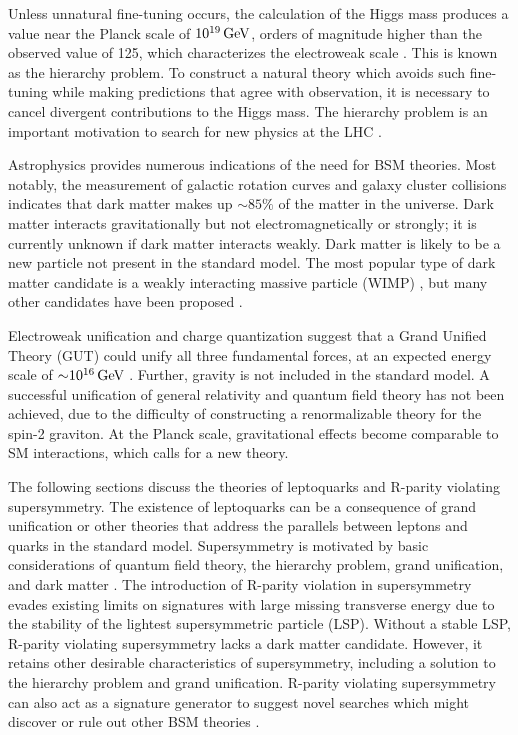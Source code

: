 \documentclass[12pt]{thesis}  %
\begin{document}
Unless unnatural fine-tuning occurs, the calculation of the Higgs mass produces a value near the Planck scale of $10^{19}\,\text{Ge\hspace{-.08em}V}$, orders of magnitude higher than the observed value of 125\GeV, which characterizes the electroweak scale \cite{Susskind1984181}. This is known as the hierarchy problem. To construct a natural theory which avoids such fine-tuning while making predictions that agree with observation, it is necessary to cancel divergent contributions to the Higgs mass. The hierarchy problem is an important motivation to search for new physics at the LHC \cite{Morrissey20121}.

Astrophysics provides numerous indications of the need for BSM theories. Most notably, the measurement of galactic rotation curves and galaxy cluster collisions \cite{BulletCluster} indicates that dark matter makes up ${\sim} 85\%$ of the matter in the universe. Dark matter interacts gravitationally but not electromagnetically or strongly; it is currently unknown if dark matter interacts weakly. Dark matter is likely to be a new particle not present in the standard model. The most popular type of dark matter candidate is a weakly interacting massive particle (WIMP) \cite{Morrissey20121}, but many other candidates have been proposed \cite{PDG}.

Electroweak unification and charge quantization suggest that a Grand Unified Theory (GUT) could unify all three fundamental forces, at an expected energy scale of ${\sim} 10^{16}\,\text{Ge\hspace{-.08em}V}$ \cite{PhysRevLett.33.451}. Further, gravity is not included in the standard model. A successful unification of general relativity and quantum field theory has not been achieved, due to the difficulty of constructing a renormalizable theory for the spin-2 graviton. At the Planck scale, gravitational effects become comparable to SM interactions, which calls for a new theory.

The following sections discuss the theories of leptoquarks and R-parity violating supersymmetry. The existence of leptoquarks can be a consequence of grand unification or other theories that address the parallels between leptons and quarks in the standard model. Supersymmetry is motivated by basic considerations of quantum field theory, the hierarchy problem, grand unification, and dark matter \cite{SUSY1,SUSY2}. The introduction of R-parity violation in supersymmetry evades existing limits on signatures with large missing transverse energy due to the stability of the lightest supersymmetric particle (LSP). Without a stable LSP, R-parity violating supersymmetry lacks a dark matter candidate. However, it retains other desirable characteristics of supersymmetry, including a solution to the hierarchy problem and grand unification. R-parity violating supersymmetry can also act as a signature generator to suggest novel searches which might discover or rule out other BSM theories \cite{EvansSigGen}.
\end{document}
